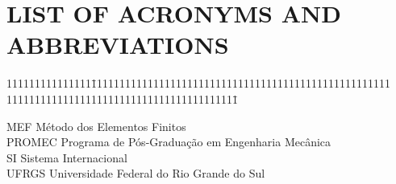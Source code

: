 \chapter*{\hfill LIST OF ACRONYMS AND ABBREVIATIONS \hfill}

\begin{tabbing}
111111111111111\=11111111111111111111111111111111111111111111111111111
11111111111111111111111111111111111111111\=\kill


MEF \> Método dos Elementos Finitos \\

PROMEC \> Programa de Pós-Graduação em Engenharia Mecânica \\

SI \> Sistema Internacional \\

UFRGS \> Universidade Federal do Rio Grande do Sul \\
\end{tabbing}